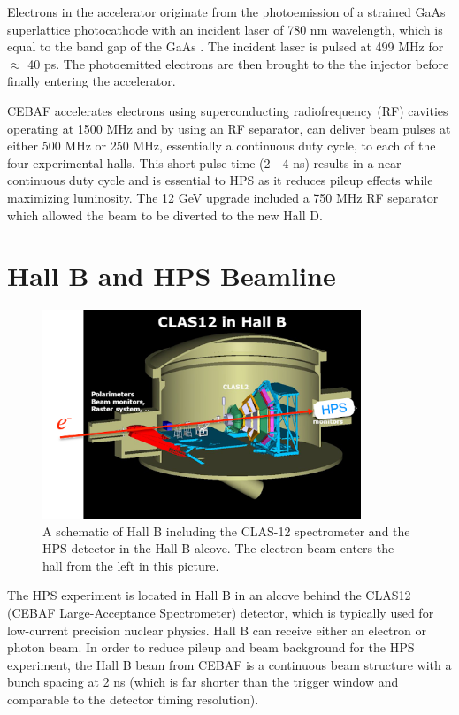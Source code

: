 Electrons in the accelerator originate from the photoemission of a strained GaAs superlattice photocathode with an incident laser of 780 nm wavelength, which is equal to the band gap of the GaAs \cite{Maruyama:2004hx}. The incident laser is pulsed at 499 MHz for $\approx$ 40 ps. The photoemitted electrons are then brought to the the injector before finally entering the accelerator.

CEBAF accelerates electrons using superconducting radiofrequency (RF) cavities operating at 1500 MHz and by using an RF separator, can deliver beam pulses at either 500 MHz or 250 MHz, essentially a continuous duty cycle, to each of the four experimental halls. This short pulse time (2 - 4 ns) results in a near-continuous duty cycle and is essential to HPS as it reduces pileup effects while maximizing luminosity. The 12 GeV upgrade included a 750 MHz RF separator which allowed the beam to be diverted to the new Hall D.

\clearpage

\section{Hall B and HPS Beamline}\label{sec:beamline}

\begin{figure}
    \centering
    \includegraphics[width=0.85\textwidth]{figs/detector/hallb.png}
    \caption{A schematic of Hall B including the CLAS-12 spectrometer and the HPS detector in the Hall B alcove. The electron beam enters the hall from the left in this picture.}
    \label{fig:hallB}
\end{figure}

The HPS experiment is located in Hall B in an alcove behind the CLAS12 (CEBAF Large-Acceptance Spectrometer) detector, which is typically used for low-current precision nuclear physics. Hall B can receive either an electron or photon beam. In order to reduce pileup and beam background for the HPS experiment, the Hall B beam from CEBAF is a continuous beam structure with a bunch spacing at 2 ns (which is far shorter than the trigger window and comparable to the detector timing resolution).

